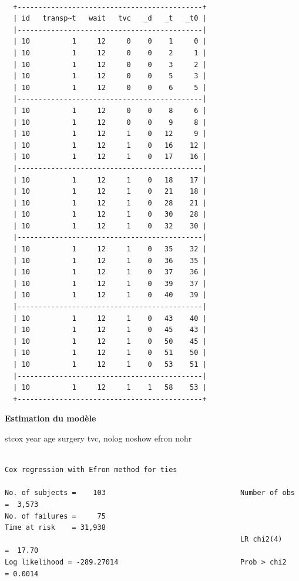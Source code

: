 \documentclass[
  12pt,
  letterpaper,
  DIV=11,
  numbers=noendperiod,
  onepage,
  openany]{scrreprt}
\newenvironment{Shaded}{\begin{snugshade}}{\end{snugshade}}
\newcommand{\FunctionTok}[1]{\textcolor[rgb]{0.94,0.94,0.56}{#1}}
\newcommand{\KeywordTok}[1]{\textcolor[rgb]{0.94,0.87,0.69}{#1}}
\newcommand{\NormalTok}[1]{\textcolor[rgb]{0.80,0.80,0.80}{#1}}
\begin{document}
\begin{verbatim}

  +--------------------------------------------+
  | id   transp~t   wait   tvc   _d   _t   _t0 |
  |--------------------------------------------|
  | 10          1     12     0    0    1     0 |
  | 10          1     12     0    0    2     1 |
  | 10          1     12     0    0    3     2 |
  | 10          1     12     0    0    5     3 |
  | 10          1     12     0    0    6     5 |
  |--------------------------------------------|
  | 10          1     12     0    0    8     6 |
  | 10          1     12     0    0    9     8 |
  | 10          1     12     1    0   12     9 |
  | 10          1     12     1    0   16    12 |
  | 10          1     12     1    0   17    16 |
  |--------------------------------------------|
  | 10          1     12     1    0   18    17 |
  | 10          1     12     1    0   21    18 |
  | 10          1     12     1    0   28    21 |
  | 10          1     12     1    0   30    28 |
  | 10          1     12     1    0   32    30 |
  |--------------------------------------------|
  | 10          1     12     1    0   35    32 |
  | 10          1     12     1    0   36    35 |
  | 10          1     12     1    0   37    36 |
  | 10          1     12     1    0   39    37 |
  | 10          1     12     1    0   40    39 |
  |--------------------------------------------|
  | 10          1     12     1    0   43    40 |
  | 10          1     12     1    0   45    43 |
  | 10          1     12     1    0   50    45 |
  | 10          1     12     1    0   51    50 |
  | 10          1     12     1    0   53    51 |
  |--------------------------------------------|
  | 10          1     12     1    1   58    53 |
  +--------------------------------------------+
\end{verbatim}

\textbf{Estimation du modèle}

\begin{Shaded}
\begin{Highlighting}[]
\KeywordTok{stcox} \FunctionTok{year}\NormalTok{ age surgery tvc, }\KeywordTok{nolog}\NormalTok{ noshow efron nohr}
\end{Highlighting}
\end{Shaded}

\begin{verbatim}

Cox regression with Efron method for ties

No. of subjects =    103                                Number of obs =  3,573
No. of failures =     75
Time at risk    = 31,938
                                                        LR chi2(4)    =  17.70
Log likelihood = -289.27014                             Prob > chi2   = 0.0014
\end{verbatim}
\end{document}
